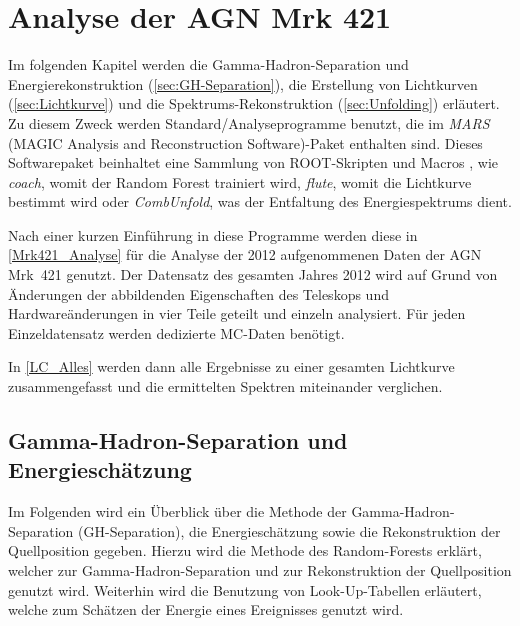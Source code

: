 \chapter{Analyse der AGN Mrk 421}
\label{chapter:Analyse}

Im folgenden Kapitel werden die Gamma-Hadron-Separation und Energierekonstruktion (\autoref{sec:GH-Separation}), die Erstellung von Lichtkurven (\autoref{sec:Lichtkurve}) und die Spektrums-Rekonstruktion (\autoref{sec:Unfolding}) erläutert.
Zu diesem Zweck werden Standard\-/Analyseprogramme benutzt, die im \textit{MARS} (MAGIC Analysis and Reconstruction Software)-Paket enthalten sind.
Dieses Softwarepaket beinhaltet eine Sammlung von ROOT-Skripten und Macros \cite{MARS}, wie \textit{coach}, womit der Random Forest trainiert wird, \textit{flute}, womit die Lichtkurve bestimmt wird oder \textit{CombUnfold}, was der Entfaltung des Energiespektrums dient. 

Nach einer kurzen Einführung in diese Programme werden diese in \autoref{Mrk421_Analyse} für die Analyse der 2012 aufgenommenen Daten der AGN Mrk~421 genutzt.
Der Datensatz des gesamten Jahres 2012 wird auf Grund von Änderungen der abbildenden Eigenschaften des Teleskops und Hardwareänderungen in vier Teile geteilt und einzeln analysiert. 
Für jeden Einzeldatensatz werden dedizierte MC-Daten benötigt.

In \autoref{LC_Alles} werden dann alle Ergebnisse zu einer gesamten Lichtkurve zusammengefasst und die ermittelten Spektren miteinander verglichen.


\section{Gamma-Hadron-Separation und Energieschätzung}
\label{sec:GH-Separation}
Im Folgenden wird ein Überblick über die Methode der Gamma-Hadron-Separation (GH-Separation), die Energieschätzung sowie die Rekonstruktion der Quellposition gegeben.  
Hierzu wird die Methode des Random-Forests erklärt, welcher zur Gamma-Hadron-Separation und zur Rekonstruktion der Quellposition genutzt wird.
Weiterhin wird die Benutzung von Look-Up-Tabellen erläutert, welche zum Schätzen der Energie eines Ereignisses genutzt wird.


